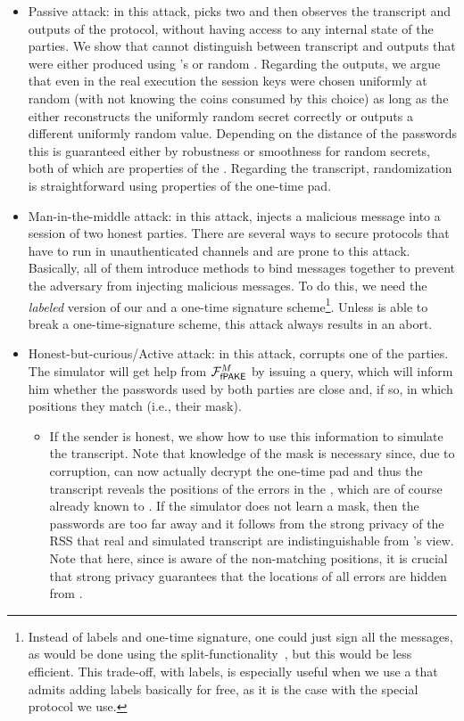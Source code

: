 \begin{itemize}
 \item Passive attack: in this attack, \Env picks two \passwords and then observes the transcript and outputs of the protocol, without having access to any internal state of the parties. We show that \Env cannot distinguish between transcript and outputs that were either produced using \Env's \passwords or random \passwords. Regarding the outputs, we argue that even in the real execution the session keys were chosen uniformly at random (with \Env not knowing the coins consumed by this choice) as long as the \RSS either reconstructs the uniformly random secret correctly or outputs a different uniformly random value. Depending on the distance of the passwords this is guaranteed either by robustness or smoothness for random secrets, both of which are properties of the \RSS. Regarding the transcript, randomization is straightforward using properties of the one-time pad.
 \item Man-in-the-middle attack: in this attack, \Env injects a malicious message into a session of two honest parties. There are several ways to secure protocols that have to run in unauthenticated channels and are prone to this attack. Basically, all of them introduce methods to bind messages together to prevent the adversary from injecting malicious messages. To do this, we need the \emph{labeled} version of our \iPAKE and a one-time signature scheme\footnote{Instead of labels and one-time signature, one could just sign all the messages, as would be done using the split-functionality~\cite{C:BCLPR05}, but this would be less efficient. This trade-off, with labels, is especially useful when we use a \PAKE that admits adding labels basically for free, as it is the case with the special \PAKE protocol we use.}. Unless \Env is able to break a one-time-signature scheme, this attack always results in an abort.  
 \item Honest-but-curious/Active attack: in this attack, \Env corrupts one of the parties. The simulator will get help from $\mathcal{F}_\textsf{fPAKE}^M$ by issuing a \TestPwd query, which will inform him whether the passwords used by both parties are close and, if so, in which positions they match (i.e., their mask). 
 \begin{itemize}
  \item If the sender is honest, we show how to use this information to simulate the transcript. Note that knowledge of the mask is necessary since, due to corruption, \Env can now actually decrypt the one-time pad and thus the transcript reveals the positions of the errors in the \passwords, which are of course already known to \Env. If the simulator does not learn a mask, then the passwords are too far away and it follows from the strong privacy of the RSS that real and simulated transcript are indistinguishable from \Env's view. Note that here, since \Env is aware of the non-matching \password positions, it is crucial that strong privacy guarantees that the locations of all errors are hidden from \Env.

\end{itemize}
\end{itemize}
